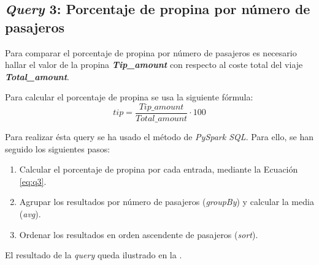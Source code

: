 



\subsection{\textit{Query} 3: Porcentaje de propina por número de pasajeros}
Para comparar el porcentaje de propina por número de pasajeros es necesario hallar el valor de la propina \textbf{\textit{Tip\_amount}} con respecto al coste total del viaje \textbf{\textit{Total\_amount}}.

Para calcular el porcentaje de propina se usa la siguiente fórmula:
\begin{equation}\label{eq:q3}
  tip = \frac{Tip\_amount}{Total\_amount} \cdot 100
\end{equation}


Para realizar ésta query se ha usado el método de \textit{PySpark SQL}. Para ello, se han seguido los siguientes pasos:
\begin{enumerate}
  \item Calcular el porcentaje de propina por cada entrada, mediante la Ecuación \ref{eq:q3}.
  \item Agrupar los resultados por número de pasajeros (\textit{groupBy}) y calcular la media (\textit{avg}).
  \item Ordenar los resultados en orden ascendente de pasajeros (\textit{sort}).
\end{enumerate}


\noindent
El resultado de la \textit{query} queda ilustrado en la .

